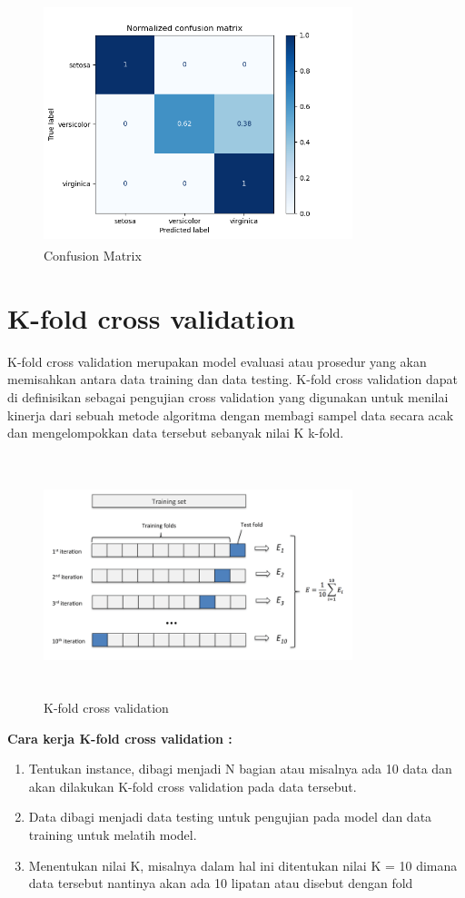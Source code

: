 	\begin{figure}[!htbp]
		\centering
		\includegraphics[width=9cm,height=7cm]{figures/Cp2-ConfusionMatrix.png}
		\caption{Confusion Matrix}
		\label{penanda}
	\end{figure}

	\section{K-fold cross validation}
	K-fold cross validation merupakan model evaluasi atau prosedur yang akan memisahkan antara data training dan data testing. K-fold cross validation dapat di definisikan sebagai pengujian cross validation yang digunakan untuk menilai kinerja dari sebuah metode algoritma dengan membagi sampel data secara acak dan mengelompokkan data tersebut sebanyak nilai K k-fold.
	\begin{figure}[!htbp]
		\centering
		\includegraphics[width=9cm,height=7cm]{figures/Cp2-K-fold cross validation.png}
		\caption{K-fold cross validation}
		\label{penanda}
	\end{figure}
	\newline
	\textbf {Cara kerja K-fold cross validation : }
	\begin{enumerate}
		\item Tentukan instance, dibagi menjadi N bagian atau misalnya ada 10 data dan akan dilakukan K-fold cross validation pada data tersebut.
		\item Data dibagi menjadi data testing untuk pengujian pada model dan data training untuk melatih model. 
		\item Menentukan nilai K, misalnya dalam hal ini ditentukan nilai K = 10 dimana data tersebut nantinya akan ada 10 lipatan atau disebut dengan fold
	\end{enumerate}

